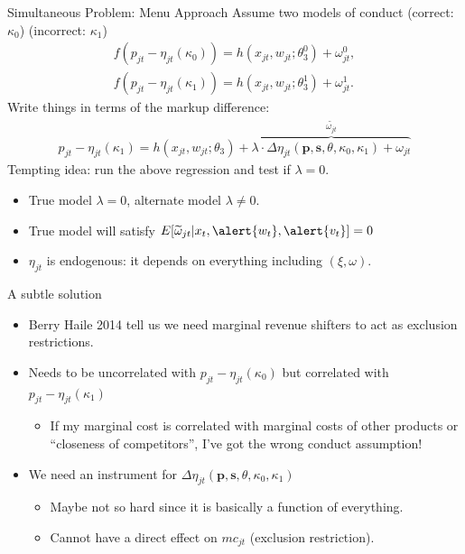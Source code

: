 \documentclass[xcolor=pdftex,dvipsnames,table,mathserif,aspectratio=169]{beamer}
\begin{document}
\begin{frame}{Simultaneous Problem: Menu Approach}
Assume two models of conduct (correct: $\kappa_0$) (incorrect: $\kappa_1$)
\begin{align*}
f(p_{jt} -\eta_{jt}(\kappa_0))= h(x_{jt},w_{jt};\theta_3^0)+\omega_{jt}^{0},\\
f(p_{jt} -\eta_{jt}(\kappa_1))= h(x_{jt},w_{jt};\theta_3^1)+\omega_{jt}^{1}.
\end{align*}
Write things in terms of the markup difference:
\begin{align*}
p_{jt} -\eta_{jt}(\kappa_1)= h(x_{jt},w_{jt};\theta_3)+ \overbrace{\lambda \cdot  \Delta \eta_{jt}(\mathbf{p},\mathbf{s},\theta,\kappa_0,\kappa_1) +   \omega_{jt}}^{\widetilde{\omega_{jt}}}
\end{align*}
Tempting idea: run the above regression and test if $\lambda=0$.
\begin{itemize}
\item True model $\lambda=0$, alternate model $\lambda \neq 0$.
\item True model will satisfy $E[\widetilde{\omega}_{jt} | x_{t}, \alert{w_{t}}, \alert{v_{t}}]=0$
\item $\eta_{jt}$ is \alert{endogenous}: it depends on everything including $(\xi,\omega)$.
\end{itemize}
\end{frame}


\begin{frame}{A subtle solution}
\begin{itemize}
\item Berry Haile 2014 tell us we need \alert{marginal revenue shifters} to act as \alert{exclusion restrictions}.
\item Needs to be uncorrelated with $p_{jt}-\eta_{jt}(\kappa_0)$ but correlated with $p_{jt}-\eta_{jt}(\kappa_1)$
\begin{itemize}
\item If my marginal cost is correlated with marginal costs of other products or ``closeness of competitors'', I've got the wrong conduct assumption!
\end{itemize}
\item We need an instrument for $\Delta \eta_{jt}(\mathbf{p},\mathbf{s},\theta,\kappa_0,\kappa_1)$
\begin{itemize}
\item Maybe not so hard since it is basically a function of everything.
\item Cannot have a direct effect on $mc_{jt}$ (exclusion restriction).
\end{itemize}
\end{itemize}
\end{frame}
\end{document}
